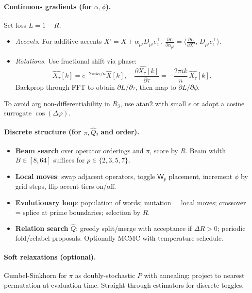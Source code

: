 \documentclass[12pt]{article}
\numberwithin{equation}{section}
\theoremstyle{plain}
\theoremstyle{definition}
\theoremstyle{remark}
\begin{document}
\paragraph{Continuous gradients (for \(\alpha,\phi\)).}
Set loss \(L=1-R\).
\begin{itemize}
  \item \emph{Accents.} For additive accents \(X' = X + \alpha_{p^j}D_{p^j}e_1^\top\),
  \(\displaystyle \frac{\partial L}{\partial \alpha_{p^j}}=\Big\langle \frac{\partial L}{\partial X'},\,D_{p^j}e_1^\top\Big\rangle\).
  \item \emph{Rotations.} Use fractional shift via phase:
  \[
  \widehat{X_\tau}[k]=e^{-2\pi i k \tau/n}\widehat{X}[k],\quad
  \frac{\partial \widehat{X_\tau}[k]}{\partial \tau}= -\frac{2\pi i k}{n}\, \widehat{X_\tau}[k].
  \]
  Backprop through FFT to obtain \(\partial L/\partial \tau\), then map to \(\partial L/\partial \phi\).
\end{itemize}
To avoid arg non-differentiability in \(R_3\), use \(\mathrm{atan2}\) with small \(\epsilon\) or adopt a cosine surrogate \(\cos(\Delta\varphi)\).

\paragraph{Discrete structure (for \(\pi,\hat{Q}\), and order).}
\begin{itemize}
  \item \textbf{Beam search} over operator orderings and \(\pi\), score by \(R\). Beam width \(B\in[8,64]\) suffices for \(p\in\{2,3,5,7\}\).
  \item \textbf{Local moves}: swap adjacent operators, toggle \(\mathsf{W}_p\) placement, increment \(\phi\) by grid steps, flip accent tiers on/off.
  \item \textbf{Evolutionary loop}: population of words; mutation = local moves; crossover = splice at prime boundaries; selection by \(R\).
  \item \textbf{Relation search} \(\hat{Q}\): greedy split/merge with acceptance if \(\Delta R>0\); periodic fold/relabel proposals. Optionally MCMC with temperature schedule.
\end{itemize}

\paragraph{Soft relaxations (optional).}
Gumbel-Sinkhorn for \(\pi\) as doubly-stochastic \(P\) with annealing; project to nearest permutation at evaluation time. Straight-through estimators for discrete toggles.
\end{document}
